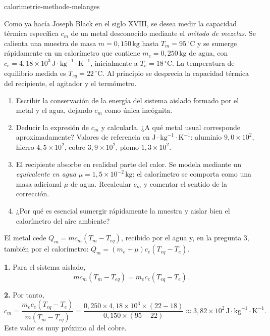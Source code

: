 \begin{exo}{calorimetrie-methode-melanges}

Como ya hacía Joseph Black en el siglo XVIII, se desea medir la capacidad térmica específica $c_m$ de un metal desconocido mediante el \emph{método de mezclas}. Se calienta una muestra de masa $m=0{,}150\,\text{kg}$ hasta $T_m=95\,^\circ\text{C}$ y se sumerge rápidamente en un calorímetro que contiene $m_e=0{,}250\,\text{kg}$ de agua, con $c_e=4{,}18\times10^3\,\text{J}\!\cdot\!\text{kg}^{-1}\!\cdot\!\text{K}^{-1}$, inicialmente a $T_e=18\,^\circ\text{C}$. La temperatura de equilibrio medida es $T_{eq}=22\,^\circ\text{C}$. Al principio se desprecia la capacidad térmica del recipiente, el agitador y el termómetro.

\begin{enumerate}
  \item Escribir la conservación de la energía del sistema aislado formado por el metal y el agua, dejando $c_m$ como única incógnita.
  \item Deducir la expresión de $c_m$ y calcularla. ¿A qué metal usual corresponde aproximadamente? Valores de referencia en $\text{J}\!\cdot\!\text{kg}^{-1}\!\cdot\!\text{K}^{-1}$: aluminio $9{,}0\times10^2$, hierro $4{,}5\times10^2$, cobre $3{,}9\times10^2$, plomo $1{,}3\times10^2$.
  \item El recipiente absorbe en realidad parte del calor. Se modela mediante un \emph{equivalente en agua} $\mu=1{,}5\times10^{-2}\,\text{kg}$: el calorímetro se comporta como una masa adicional $\mu$ de agua. Recalcular $c_m$ y comentar el sentido de la corrección.
  \item ¿Por qué es esencial sumergir rápidamente la muestra y aislar bien el calorímetro del aire ambiente?
\end{enumerate}

\begin{indication}
El metal cede $Q_m=mc_m(T_m-T_{eq})$, recibido por el agua y, en la pregunta 3, también por el calorímetro: $Q_m=(m_e+\mu)c_e(T_{eq}-T_e)$.
\end{indication}

\begin{solution}
\textbf{1.} Para el sistema aislado,
\[
mc_m(T_m-T_{eq})=m_ec_e(T_{eq}-T_e).
\]

\textbf{2.} Por tanto,
\[
c_m=\frac{m_ec_e(T_{eq}-T_e)}{m(T_m-T_{eq})}
=\frac{0{,}250\times4{,}18\times10^3\times(22-18)}{0{,}150\times(95-22)}
\approx3{,}82\times10^2\,\text{J}\!\cdot\!\text{kg}^{-1}\!\cdot\!\text{K}^{-1}.
\]
Este valor es muy próximo al del cobre.


\end{solution}
\end{exo}
